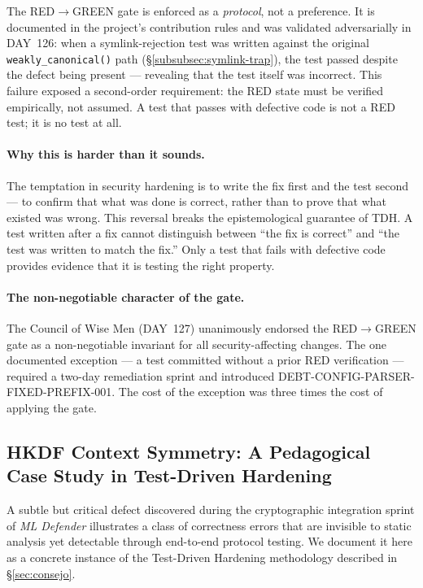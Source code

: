 \documentclass[11pt,a4paper]{article}
\begin{document}
    The RED$\to$GREEN gate is enforced as a \emph{protocol}, not a preference.
    It is documented in the project's contribution rules and was validated
    adversarially in DAY~126: when a symlink-rejection test was written against
    the original \texttt{weakly\_canonical()} path
    (\S\ref{subsubsec:symlink-trap}), the test passed despite the defect being
    present --- revealing that the test itself was incorrect. This failure exposed
    a second-order requirement: the RED state must be verified empirically, not
    assumed. A test that passes with defective code is not a RED test; it is no
    test at all.

    \paragraph{Why this is harder than it sounds.}
    The temptation in security hardening is to write the fix first and the test
    second --- to confirm that what was done is correct, rather than to prove that
    what existed was wrong. This reversal breaks the epistemological guarantee of
    TDH. A test written after a fix cannot distinguish between ``the fix is correct''
    and ``the test was written to match the fix.'' Only a test that fails with
    defective code provides evidence that it is testing the right property.

    \paragraph{The non-negotiable character of the gate.}
    The Council of Wise Men (DAY~127) unanimously endorsed the RED$\to$GREEN gate
    as a non-negotiable invariant for all security-affecting changes. The one
    documented exception --- a test committed without a prior RED verification ---
    required a two-day remediation sprint and introduced DEBT-CONFIG-PARSER-FIXED-PREFIX-001.
    The cost of the exception was three times the cost of applying the gate.

    \subsection{HKDF Context Symmetry: A Pedagogical Case Study in Test-Driven Hardening}
    \label{subsec:hkdf-context-symmetry}

    A subtle but critical defect discovered during the cryptographic integration
    sprint of \emph{ML Defender} illustrates a class of correctness errors that
    are invisible to static analysis yet detectable through end-to-end protocol
    testing. We document it here as a concrete instance of the
    Test-Driven Hardening methodology described in \S\ref{sec:consejo}.
\end{document}
